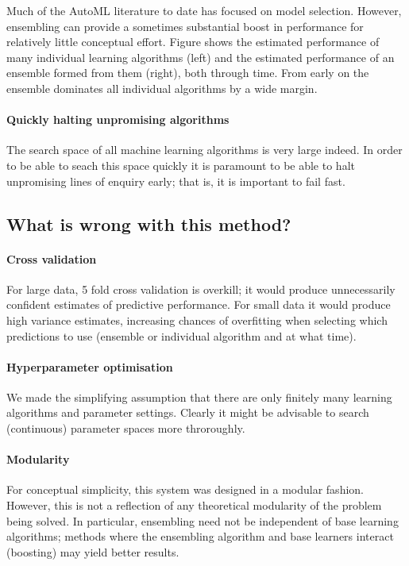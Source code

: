 \documentclass{article} %
\begin{document}
Much of the AutoML literature to date has focused on model selection.
However, ensembling can provide a sometimes substantial boost in performance for relatively little conceptual effort.
Figure shows the estimated performance of many individual learning algorithms (left) and the estimated performance of an ensemble formed from them (right), both through time.
From early on the ensemble dominates all individual algorithms by a wide margin.

\paragraph{Quickly halting unpromising algorithms}

The search space of all machine learning algorithms is very large indeed.
In order to be able to seach this space quickly it is paramount to be able to halt unpromising lines of enquiry early; that is, it is important to fail fast.

\subsection{What is wrong with this method?}

\paragraph{Cross validation}

For large data, 5 fold cross validation is overkill; it would produce unnecessarily confident estimates of predictive performance.
For small data it would produce high variance estimates, increasing chances of overfitting when selecting which predictions to use (ensemble or individual algorithm and at what time).

\paragraph{Hyperparameter optimisation}

We made the simplifying assumption that there are only finitely many learning algorithms and parameter settings.
Clearly it might be advisable to search (continuous) parameter spaces more throroughly.

\paragraph{Modularity}

For conceptual simplicity, this system was designed in a modular fashion.
However, this is not a reflection of any theoretical modularity of the problem being solved.
In particular, ensembling need not be independent of base learning algorithms; methods where the ensembling algorithm and base learners interact (\eg boosting) may yield better results.
\end{document}
